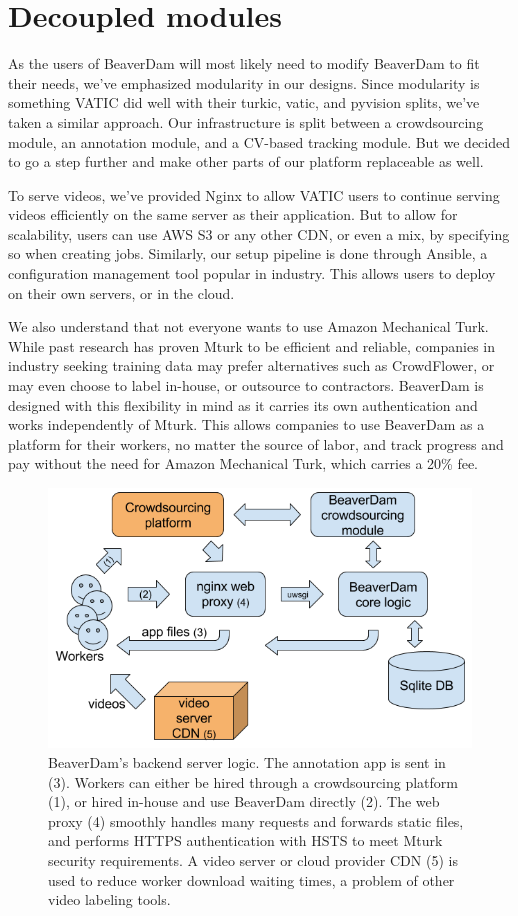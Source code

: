 \section{Decoupled modules}

As the users of BeaverDam will most likely need to modify BeaverDam to fit their needs,
we've emphasized modularity in our designs.
Since modularity is something VATIC did well with their turkic, vatic, and pyvision splits,
we've taken a similar approach.
Our infrastructure is split between a crowdsourcing module, an annotation module, and a CV-based tracking module.
But we decided to go a step further and make other parts of our platform replaceable as well.

To serve videos, we've provided Nginx to allow VATIC users to continue serving videos efficiently on the same server as their application.
But to allow for scalability, users can use AWS S3 or any other CDN, or even a mix, by specifying so when creating jobs.
Similarly, our setup pipeline is done through Ansible, a configuration management tool popular in industry.
This allows users to deploy on their own servers, or in the cloud.

We also understand that not everyone wants to use Amazon Mechanical Turk.
While past research has proven Mturk to be efficient and reliable,
companies in industry seeking training data may prefer alternatives such as CrowdFlower,
or may even choose to label in-house, or outsource to contractors.
BeaverDam is designed with this flexibility in mind as it carries its own authentication and works independently of Mturk.
This allows companies to use BeaverDam as a platform for their workers, no matter the source of labor,
and track progress and pay without the need for Amazon Mechanical Turk, which carries a 20\% fee.

\begin{figure}[h]
\includegraphics[width=14cm]{figs/backend.png}
\centering
\caption{BeaverDam's backend server logic. The annotation app is sent in (3). Workers can either be hired through a crowdsourcing platform (1), or hired in-house and use BeaverDam directly (2). The web proxy (4) smoothly handles many requests and forwards static files, and performs HTTPS authentication with HSTS to meet Mturk security requirements. A video server or cloud provider CDN (5) is used to reduce worker download waiting times, a problem of other video labeling tools.}
\end{figure}

